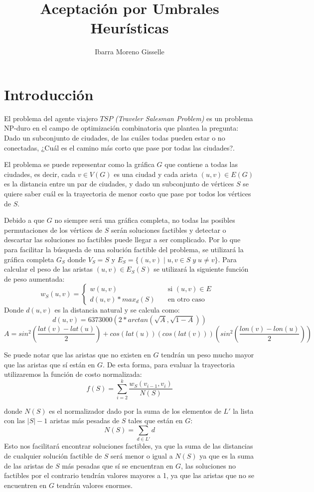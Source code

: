 \documentclass[12pt]{article}
\author{Ibarra Moreno Gisselle }
\title{Aceptación por Umbrales\\Heurísticas}
\begin{document}
	\maketitle
	\section{Introducción}
	
	El problema del agente viajero $TSP$ \textit{(Traveler Salesman Problem)} es un 
	problema NP-duro en el campo de optimización combinatoria que plantea la pregunta:
	Dado un subconjunto de ciudades, de las cuáles todas pueden estar o no conectadas, 
	¿Cuál es el camino más corto que pase por todas las ciudades?.
	
	El problema se puede representar como la gráfica $G$ que contiene a todas las 
	ciudades, es decir, cada $v\in V(G)$ es una ciudad y cada arista $(u,v)\in E(G)$ es 
	la distancia entre un par de ciudades, y dado un subconjunto de vértices $S$ se 
	quiere saber cuál es la trayectoria de menor costo que pase por todos los vértices de
	$S$. 
	
	Debido a que $G$ no siempre será una gráfica completa, no todas las posibles 
	permutaciones de los vértices de $S$ serán soluciones factibles y 
	detectar o descartar las soluciones no factibles puede llegar a ser complicado. 
	Por lo que para facilitar la búsqueda de una solución factible del problema, se
	utilizará la gráfica completa $G_S$ donde $V_S=S$ y $E_S=\{(u,v) \mid u,v\in S \; y 
	\; u \neq v\}$. Para calcular el peso de las aristas $(u,v)\in E_S(S)$ se utilizará la 
	siguiente función de peso aumentada:
	\[w_S(u,v)=\begin{cases}
	\text{$w(u,v)$} &\quad\text{si $(u,v)\in E$ }\\
	\text{$d(u,v)*max_d(S)$} &\quad\text{en otro caso}
	\end{cases}
	\]
	Donde $d(u,v)$ es la distancia natural y se calcula como:
	\[d(u,v)=6373000(2*arctan(\sqrt{A},\sqrt{1-A}))\]
	\[A=sin^2(\frac{lat(v)-lat(u)}{2})+cos(lat(u))(cos(lat(v)))(sin^2(\frac{lon(v)-
		lon(u)}{2}))\]
	
	Se puede notar que las aristas que no existen en $G$ tendrán un 
	peso mucho mayor que las aristas que sí están en $G$. De esta forma, para evaluar la 
	trayectoria	utilizaremos la función de costo normalizada:
	\[f(S)=\sum_{i=2}^{k}\frac{ w_S(v_{i-1},v_i)}{N(S)} \]
	
	donde $N(S)$ es el normalizador dado por la suma de los elementos de $L'$ la lista con 
	las $|S|-1$ aristas más	pesadas de $S$ tales que están en $G$:
	\[ N(S)=\sum_{d\in L'} d\]
	Esto nos facilitará encontrar soluciones factibles, ya que la suma de las distancias 
	de cualquier solución factible de $S$ será menor o igual a $N(S)$ ya que es la suma
	de las aristas de $S$ más pesadas que sí se encuentran en $G$, las soluciones no
	factibles por el contrario tendrán valores mayores a 1, ya que las aristas que no 
	se encuentren en $G$ tendrán valores enormes. 
	
\end{document}
